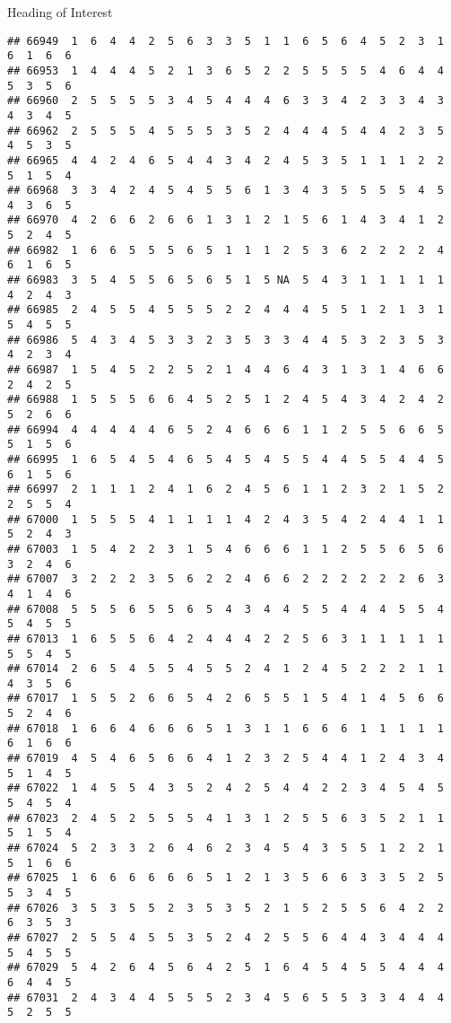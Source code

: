 \documentclass[
  ignorenonframetext,
]{beamer}
\begin{document}
\begin{frame}[fragile]{Heading of Interest}
\begin{verbatim}
## 66949  1  6  4  4  2  5  6  3  3  5  1  1  6  5  6  4  5  2  3  1  6  1  6  6
## 66953  1  4  4  4  5  2  1  3  6  5  2  2  5  5  5  5  4  6  4  4  5  3  5  6
## 66960  2  5  5  5  5  3  4  5  4  4  4  6  3  3  4  2  3  3  4  3  4  3  4  5
## 66962  2  5  5  5  4  5  5  5  3  5  2  4  4  4  5  4  4  2  3  5  4  5  3  5
## 66965  4  4  2  4  6  5  4  4  3  4  2  4  5  3  5  1  1  1  2  2  5  1  5  4
## 66968  3  3  4  2  4  5  4  5  5  6  1  3  4  3  5  5  5  5  4  5  4  3  6  5
## 66970  4  2  6  6  2  6  6  1  3  1  2  1  5  6  1  4  3  4  1  2  5  2  4  5
## 66982  1  6  6  5  5  5  6  5  1  1  1  2  5  3  6  2  2  2  2  4  6  1  6  5
## 66983  3  5  4  5  5  6  5  6  5  1  5 NA  5  4  3  1  1  1  1  1  4  2  4  3
## 66985  2  4  5  5  4  5  5  5  2  2  4  4  4  5  5  1  2  1  3  1  5  4  5  5
## 66986  5  4  3  4  5  3  3  2  3  5  3  3  4  4  5  3  2  3  5  3  4  2  3  4
## 66987  1  5  4  5  2  2  5  2  1  4  4  6  4  3  1  3  1  4  6  6  2  4  2  5
## 66988  1  5  5  5  6  6  4  5  2  5  1  2  4  5  4  3  4  2  4  2  5  2  6  6
## 66994  4  4  4  4  4  6  5  2  4  6  6  6  1  1  2  5  5  6  6  5  5  1  5  6
## 66995  1  6  5  4  5  4  6  5  4  5  4  5  5  4  4  5  5  4  4  5  6  1  5  6
## 66997  2  1  1  1  2  4  1  6  2  4  5  6  1  1  2  3  2  1  5  2  2  5  5  4
## 67000  1  5  5  5  4  1  1  1  1  4  2  4  3  5  4  2  4  4  1  1  5  2  4  3
## 67003  1  5  4  2  2  3  1  5  4  6  6  6  1  1  2  5  5  6  5  6  3  2  4  6
## 67007  3  2  2  2  3  5  6  2  2  4  6  6  2  2  2  2  2  2  6  3  4  1  4  6
## 67008  5  5  5  6  5  5  6  5  4  3  4  4  5  5  4  4  4  5  5  4  5  4  5  5
## 67013  1  6  5  5  6  4  2  4  4  4  2  2  5  6  3  1  1  1  1  1  5  5  4  5
## 67014  2  6  5  4  5  5  4  5  5  2  4  1  2  4  5  2  2  2  1  1  4  3  5  6
## 67017  1  5  5  2  6  6  5  4  2  6  5  5  1  5  4  1  4  5  6  6  5  2  4  6
## 67018  1  6  6  4  6  6  6  5  1  3  1  1  6  6  6  1  1  1  1  1  6  1  6  6
## 67019  4  5  4  6  5  6  6  4  1  2  3  2  5  4  4  1  2  4  3  4  5  1  4  5
## 67022  1  4  5  5  4  3  5  2  4  2  5  4  4  2  2  3  4  5  4  5  5  4  5  4
## 67023  2  4  5  2  5  5  5  4  1  3  1  2  5  5  6  3  5  2  1  1  5  1  5  4
## 67024  5  2  3  3  2  6  4  6  2  3  4  5  4  3  5  5  1  2  2  1  5  1  6  6
## 67025  1  6  6  6  6  6  6  5  1  2  1  3  5  6  6  3  3  5  2  5  5  3  4  5
## 67026  3  5  3  5  5  2  3  5  3  5  2  1  5  2  5  5  6  4  2  2  6  3  5  3
## 67027  2  5  5  4  5  5  3  5  2  4  2  5  5  6  4  4  3  4  4  4  5  4  5  5
## 67029  5  4  2  6  4  5  6  4  2  5  1  6  4  5  4  5  5  4  4  4  6  4  4  5
## 67031  2  4  3  4  4  5  5  5  2  3  4  5  6  5  5  3  3  4  4  4  5  2  5  5

\end{verbatim}
\end{frame}
\end{document}
